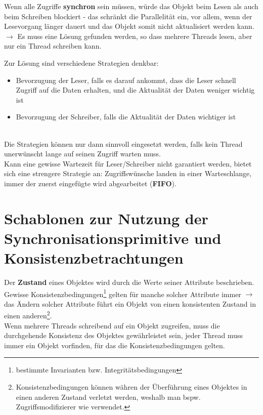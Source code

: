 \noindent
Wenn alle Zugriffe \textbf{synchron} sein müssen, würde das Objekt beim Lesen als auch beim Schreiben blockiert - das schränkt die Parallelität ein, vor allem, wenn der Lesevorgang länger dauert und das Objekt somit nicht aktualisiert werden kann.\\

\noindent
$\rightarrow$ Es muss eine Lösung gefunden werden, so dass mehrere Threads lesen, aber nur ein Thread schreiben kann.

Zur Lösung sind verschiedene Strategien denkbar:

\begin{itemize}
    \item Bevorzugung der Leser, falls es darauf ankommt, dass die Leser schnell Zugriff auf die Daten erhalten, und die Aktualität der Daten weniger wichtig ist
    \item Bevorzugung der Schreiber, falls die Aktualität der Daten wichtiger ist
\end{itemize}\\

\noindent
Die Strategien können nur dann sinnvoll eingesetzt werden, falls kein Thread unerwünscht lange auf seinen Zugriff warten muss.\\
Kann eine gewisse Wartezeit für Leser/Schreiber nicht garantiert werden, bietet sich eine strengere Strategie an: Zugriffswünsche landen in einer Warteschlange, immer der zuerst eingefügte wird abgearbeitet (\textbf{FIFO}).


\section{Schablonen zur Nutzung der Synchronisationsprimitive und Konsistenzbetrachtungen}

Der \textbf{Zustand} eines Objektes wird durch die Werte seiner Attribute beschrieben.\\

\noindent
Gewisse Konsistenzbedingungen\footnote{bestimmte Invarianten bzw. Integritätsbedingungen} gelten für manche solcher Attribute immer $\rightarrow$ das Ändern solcher Attribute führt ein Objekt von einen konsistenten Zustand in einen anderen\footnote{
Konsistenzbedingungen können währen der Überführung eines Objektes in einen anderen Zustand verletzt werden, weshalb man bspw. Zugriffsmodifizierer wie  verwendet.
}.\\

\noindent
Wenn mehrere Threads schreibend auf ein Objekt zugreifen, muss die durchgehende Konsistenz des Objektes gewährleistet sein, jeder Thread muss immer ein Objekt vorfinden, für das die Konsistenzbedingungen gelten.\\

